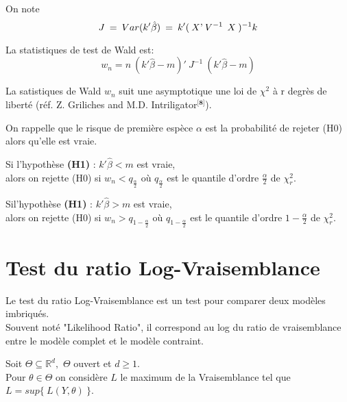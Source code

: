 \documentclass[12pt,fleqn]{book} %
\begin{document}
  \vspace{1em}
  
  On note 
  \[
  J\:=\:Var(k'\hat{\beta})\:=\:k' (\:X\textnormal{'} \:V^{-1}\:\: X\:)^{-1} k
  \]
 
  \vspace{1em}
  
 La statistiques de test de Wald est: 
 \[
 w_n=n\:(k'\hat{\beta}-m)'\:J^{-1}\:(k'\hat{\beta}-m) 
 \]
\vspace{1em}

La satistiques de Wald $w_n$ suit une asymptotique une loi de $\chi^2$ à r degrès de liberté (réf.  Z. Griliches and M.D. Intriligator$^{\textbf{[8]}}$). 

\vspace{1em}

On rappelle que le risque de première espèce $\alpha$ est la probabilité de rejeter (H0) alors qu'elle est vraie. 

\vspace{1em}

Si l'hypothèse \textbf{(H1)} :  \: $k'\hat{\beta} < m$ est vraie,\\
alors on rejette (H0) si \: $w_n < q_{\frac{\alpha}{2}}$ \:où\: $q_{\frac{\alpha}{2}}$ est le quantile d'ordre $\frac{\alpha}{2}$ de $\chi_r^2$.

\vspace{1em}

Sil'hypothèse \textbf{(H1)} :  \: $k'\hat{\beta} > m$ est vraie,\\
alors on rejette (H0) si \: $w_n > q_{1-\frac{\alpha}{2}}$ \:où\: $q_{1-\frac{\alpha}{2}}$ est le quantile d'ordre $1-\frac{\alpha}{2}$ de $\chi_r^2$.


\newpage

\section{Test du ratio Log-Vraisemblance}

\vspace{1em}

Le test du ratio Log-Vraisemblance est un test pour comparer deux modèles imbriqués.\\ 
Souvent noté "Likelihood Ratio", il correspond au log du ratio de vraisemblance entre le modèle complet et le modèle contraint.

\vspace{1em}

Soit $\Theta\subseteq \mathbb{R}^d,$ $\Theta$ ouvert et $d\geq 1$.\\ Pour $\theta\in\Theta$ on considère $L$ le maximum de la Vraisemblance tel que $L=sup\{\:L(Y,\theta)\:\}$. 
\end{document}
